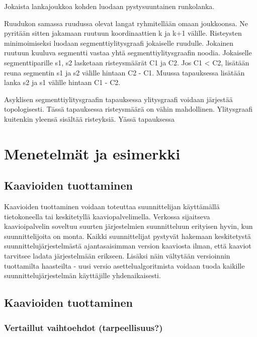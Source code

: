 \documentclass[finnish,12pt]{article}
\begin{document}
Jokaista lankajoukkoa kohden luodaan pystysuuntainen runkolanka.

Ruudukon samassa ruudussa olevat langat ryhmitellään omaan joukkoonsa.
Ne pyritään sitten jakamaan ruutuun koordinaattien k ja k+1 välille.
Risteysten minimoimiseksi luodaan segmenttiylitysgraafi jokaiselle ruudulle. Jokainen ruutuun kuuluva segmentti vastaa yhtä segmenttiylitysgraafin noodia. Jokaiselle segmenttiparille s1, s2 lasketaan risteysmäärät C1 ja C2. Jos C1 < C2, lisätään reuna segmentin s1 ja s2 välille hintaan C2 - C1. Muussa tapauksessa lisätään lanka s2 ja s1 välille hintaan C1 - C2.

Asyklisen segmenttiylitysgraafin tapauksessa ylitysgraafi voidaan järjestää topologisesti. Tässä tapauksessa risteysmäärä on vähin mahdollinen. Ylitysgraafi kuitenkin yleensä sisältää risteyksiä. Yässä tapauksessa 

	\clearpage
	\section{Menetelmät ja esimerkki}

		\subsection{Kaavioiden tuottaminen}

Kaavioiden tuottaminen voidaan toteuttaa suunnittelijan käyttämällä tietokoneella tai keskitetyllä kaaviopalvelimella.
Verkossa sijaitseva kaavioipalvelin soveltuu suurten järjestelmien suunnitteluun erityisen hyvin, kun suunnittelijoita on monta. Kaikki suunnittelijat pystyvät hakemaan keskitetystä suunnittelujärjestelmästä ajantasaisimman version kaaviosta ilman, että kaaviot tarvitsee ladata järjestelmään erikseen.
Lisäksi näin vältytään versioinnin tuottamilta haasteilta - uusi versio asettelualgoritmista voidaan tuoda kaikille suunnittelujärjestelmän käyttäjille yhdenaikaisesti.

		\subsection{Kaavioiden tuottaminen}
			\subsubsection{Vertaillut vaihtoehdot (tarpeellisuus?)}
\end{document}
